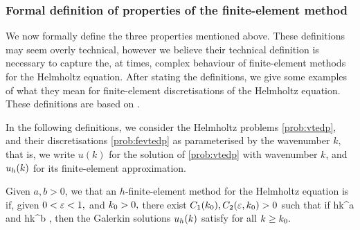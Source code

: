 





\subsubsection{Formal definition of properties of the finite-element method}\label{sec:femprops}

We now formally define the three properties mentioned above. These definitions may seem overly technical, however we believe their technical definition is necessary to capture the, at times, complex behaviour of finite-element methods for the Helmholtz equation. After stating the definitions, we give some examples of what they mean for finite-element discretisations of the Helmholtz equation. These definitions are based on \cite[Definition 2.3]{DiMoSp:19}.

In the following definitions, we consider the Helmholtz problems \cref{prob:vtedp}, and their discretisations \cref{prob:fevtedp} as parameterised by the wavenumber $k,$ that is, we write $u(k)$ for the solution of \cref{prob:vtedp} with wavenumber $k$, and $u_{h}(k)$ for its finite-element approximation.

\bde[$\hk{a}{b}$-accurate]\label{def:hkacc}
Given $a,b>0$, we that an $h$-finite-element method for the Helmholtz equation is  if, given $0 < \varepsilon < 1,$ and $k_{0} > 0,$ there exist $C_{1}(k_{0}), C_{2}(\varepsilon,k_{0}) > 0$ such that if
\beqs
hk^a \leq \Co
\eeqs
and
\beqs
hk^b \leq \Ct,
\eeqs
then the Galerkin solutions $u_{h}(k)$ satisfy
\beq\label{eq:hkacc}
 \leq \eps
\eeq
for all $k \geq k_{0}.$

